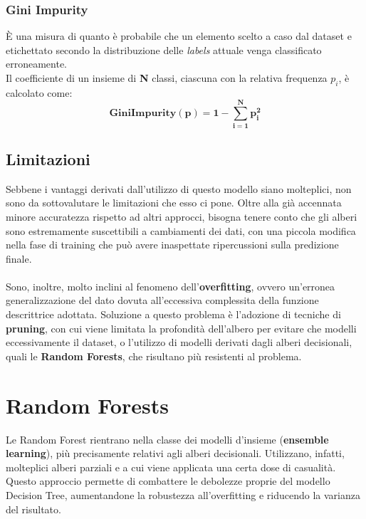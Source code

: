 \subsubsection{Gini Impurity}
È una misura di quanto è probabile che un elemento scelto a caso dal dataset e etichettato secondo la distribuzione delle \textit{labels} attuale venga classificato erroneamente.\\
Il coefficiente di un insieme di \textbf{N} classi, ciascuna con la relativa frequenza $\mathit{p_{i}}$, è calcolato come:
\[ \mathbf{GiniImpurity(p) = 1-\sum_{i=1}^Np_{i}^2 } \]

\subsection{Limitazioni}
Sebbene i vantaggi derivati dall'utilizzo di questo modello siano molteplici, non sono da sottovalutare le limitazioni che esso ci pone. Oltre alla già accennata minore accuratezza rispetto ad altri approcci, bisogna tenere conto che gli alberi sono estremamente suscettibili a cambiamenti dei dati, con una piccola modifica nella fase di training che può avere inaspettate ripercussioni sulla predizione finale.\\\\
Sono, inoltre, molto inclini al fenomeno dell'\textbf{overfitting}, ovvero un'erronea generalizzazione del dato dovuta all'eccessiva complessita della funzione descrittrice adottata. Soluzione a questo problema è l'adozione di tecniche di \textbf{pruning}, con cui viene limitata la profondità dell'albero per evitare che modelli eccessivamente il dataset, o l'utilizzo di modelli derivati dagli alberi decisionali, quali le \textbf{Random Forests}, che risultano più resistenti al problema.

\pagebreak

\section{Random Forests}
Le Random Forest rientrano nella classe dei modelli d'insieme (\textbf{ensemble learning}), più precisamente relativi agli alberi decisionali. Utilizzano, infatti, molteplici alberi parziali e a cui viene applicata una certa dose di casualità. Questo approccio permette di combattere le debolezze proprie del modello Decision Tree, aumentandone la robustezza all'overfitting e riducendo la varianza del risultato.

